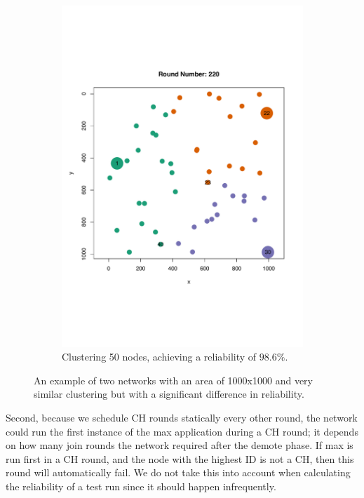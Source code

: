 \begin{figure}[bt]
\begin{subfigure}{0.49\textwidth}
        \includegraphics[width=\textwidth, keepaspectratio]{figure/Results/Discussion/ClusteringExample50nodes1000x1000maxOffRun5Good.pdf}
        \caption{Clustering 50 nodes, achieving a reliability of $98.6\%$.}
        \label{subfig:good-clustering}
    \end{subfigure}
    \caption{An example of two networks with an area of 1000x1000 and very similar clustering but with a significant difference in reliability.}
    \label{fig:comparing-good-and-bad-clustering}
\end{figure}



Second, because we schedule CH rounds statically every other round, the network could run the first instance of the max application during a CH round; it depends on how many join rounds the network required after the demote phase. If max is run first in a CH round, and the node with the highest ID is not a CH, then this round will automatically fail. We do not take this into account when calculating the reliability of a test run since it should happen infrequently.

